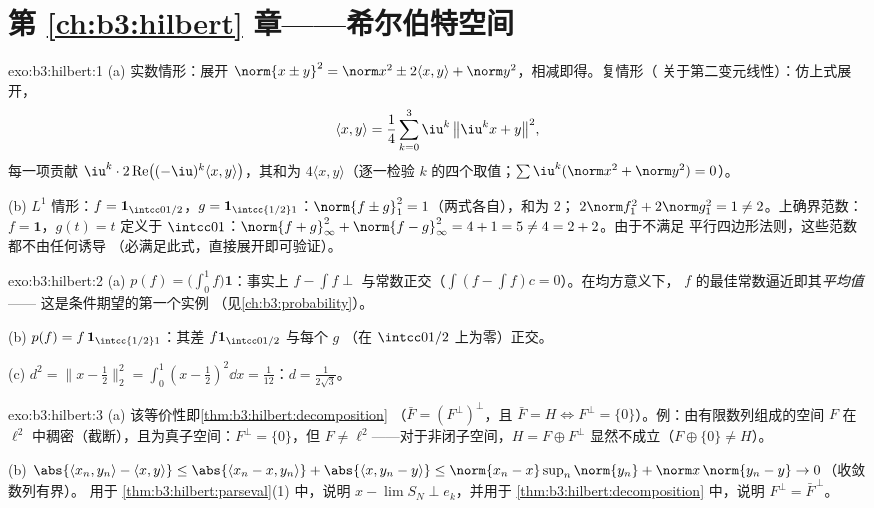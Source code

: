\section*{第 \ref{ch:b3:hilbert} 章——希尔伯特空间}

\begin{solution}{exo:b3:hilbert:1}
(a) 实数情形：展开 $\norm{x \pm y}^2 = \norm x^2 \pm 2\langle
x,y\rangle + \norm y^2$，相减即得。复情形（
关于第二变元线性）：仿上式展开，
\[
\langle x, y\rangle = \frac14\sum_{k=0}^{3}
\iu^k\,\bigl\|\iu^kx + y\bigr\|^2,
\]
每一项贡献 $\iu^k\cdot2\operatorname{Re}\bigl(
(-\iu)^k\langle x,y\rangle\bigr)$，其和为 $4\langle
x,y\rangle$（逐一检验 $k$ 的四个取值；$\sum\iu^k
(\norm x^2 + \norm y^2) = 0$）。

(b) $L^1$ 情形：$f = \mathbf 1_{\intcc0{1/2}}$，$g = \mathbf
1_{\intcc{1/2}1}$：$\norm{f\pm g}_1^2 = 1$（两式各自），和为 $2$；
$2\norm f_1^2 + 2\norm g_1^2 = 1 \neq 2$。上确界范数：$f =
\mathbf 1$，$g(t) = t$ 定义于 $\intcc01$：$\norm{f + g}_\infty^2 +
\norm{f-g}_\infty^2 = 4 + 1 = 5 \neq 4 = 2 + 2$。由于不满足
平行四边形法则，这些范数都不由任何诱导
（必满足此式，直接展开即可验证）。
\end{solution}

\begin{solution}{exo:b3:hilbert:2}
(a) $p(f) = \bigl(\int_0^1f\bigr)\mathbf 1$：事实上 $f - \int f
\perp$ 与常数正交（$\int(f - \int f)c = 0$）。在均方意义下，
$f$ 的最佳常数逼近即其\emph{平均值}——
这是条件期望的第一个实例
（见\cref{ch:b3:probability}）。

(b) $p(f) = f\,\mathbf 1_{\intcc{1/2}1}$：其差
$f\mathbf 1_{\intcc0{1/2}}$ 与每个 $g$
（在 $\intcc0{1/2}$ 上为零）正交。

(c) $d^2 = \bigl\|x - \tfrac12\bigr\|_2^2 = \int_0^1(x -
\tfrac12)^2\dd x = \tfrac1{12}$：$d = \frac1{2\sqrt3}$。
\end{solution}

\begin{solution}{exo:b3:hilbert:3}
(a) 该等价性即\cref{thm:b3:hilbert:decomposition}
（$\bar F = (F^\perp)^\perp$，且 $\bar F = H \iff F^\perp =
\{0\}$）。例：由有限数列组成的空间 $F$ 在
$\ell^2$ 中稠密（截断），且为真子空间：$F^\perp = \{0\}$，但 $F
\neq \ell^2$——对于非闭子空间，$H = F \oplus
F^\perp$ 显然不成立（$F \oplus \{0\} \neq H$）。

(b) $\abs{\langle x_n, y_n\rangle - \langle x, y\rangle} \leq
\abs{\langle x_n - x, y_n\rangle} + \abs{\langle x, y_n -
y\rangle} \leq \norm{x_n - x}\sup_n\norm{y_n} + \norm
x\,\norm{y_n - y} \to 0$（收敛数列有界）。
用于 \cref{thm:b3:hilbert:parseval}(1) 中，说明 $x - \lim
S_N \perp e_k$，并用于 \cref{thm:b3:hilbert:decomposition}
中，说明 $F^\perp = \bar F^{\,\perp}$。
\end{solution}

